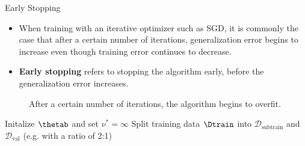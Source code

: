 





\newcommand{\Dsubtrain}{\mathcal{D}_{\text{subtrain}}}
\newcommand{\Dval}{\mathcal{D}_{\text{val}}}





\begin{vbframe}{Early Stopping}
  
  \begin{itemize}
    \item When training with an iterative optimizer such as SGD, it is commonly the case that after a certain number of iterations, generalization error begins to increase even though training error continues to decrease.     
    \item \textbf{Early stopping} refers to stopping the algorithm early, before the generalization error increases.
  \end{itemize}
  \begin{figure}
    \centering
      \caption{After a certain number of iterations, the algorithm begins to overfit.}
  \end{figure}
\framebreak
   \begin{algorithm}[H]
  \footnotesize
  \caption{Early Stopping}
    \begin{algorithmic}[1]
      \State Initalize $\thetab$ and set $\nu^* = \infty$
      \State Split training data $\Dtrain$ into $\mathcal{D}_{\text{subtrain}}$ and $\mathcal{D}_{\text{val}}$ (e.g. with a ratio of 2:1)

\end{algorithmic}
\end{algorithm}
\end{vbframe}
